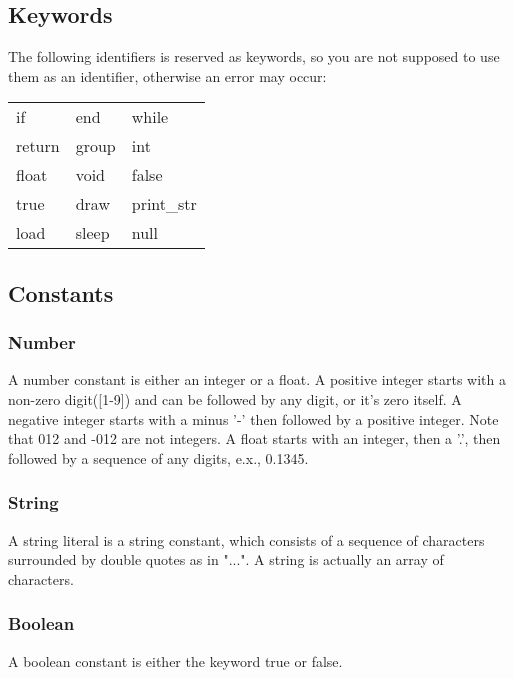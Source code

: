 \documentclass[11pt,letterpaper]{article}
\begin{document}
\subsection {Keywords}
The following identifiers is reserved as keywords, so you are not supposed to use them as an identifier, otherwise an error may occur:

\begin{center}
    \begin{tabular}{l l l}
		if 		& end 	& while \\
		return	& group	& int 	\\
		float	& void	& false	\\ 
		true		& draw	& print\_str		\\
		load		& sleep	& null			\\
    \end{tabular}
\end{center}

\subsection {Constants}
\subsubsection {Number}
A number constant is either an integer or a float. A positive integer starts with a non-zero digit([1-9]) and can be followed by any digit, or it's zero itself. A negative integer starts with a minus '-' then followed by a positive integer. Note that 012 and -012 are not integers. A float starts with an integer, then a '.', then followed by a sequence of any digits, e.x., 0.1345.

\subsubsection {String}
A string literal is a string constant, which consists of a sequence of characters surrounded by double quotes as in "...". A string is actually an array of characters.

\subsubsection {Boolean}
A boolean constant is either the keyword true or false.
\end{document}
